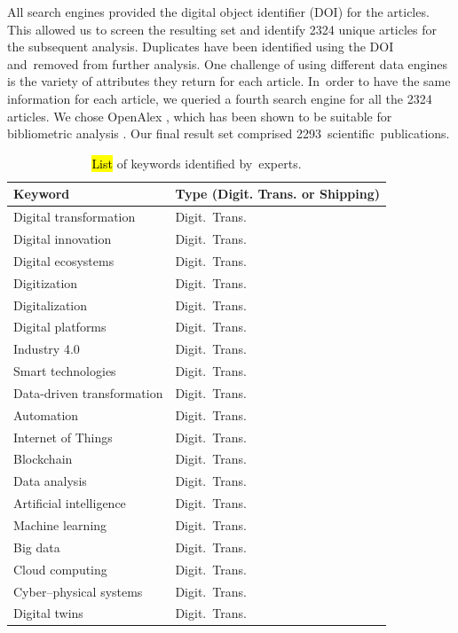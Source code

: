 \documentclass[jmse,review,accept,pdftex,moreauthors]{Definitions/mdpi}
\begin{document}
All search engines provided the digital object identifier (DOI) for the articles. This allowed us to screen the resulting set and identify 2324 unique articles for the subsequent analysis. Duplicates have been identified using the DOI and~removed from further analysis. One challenge of using different data engines is the variety of attributes they return for each article. In~order to have the same information for each article, we queried a fourth search engine for all the 2324 articles. We chose OpenAlex \citep{priem2022openalex}, which has been shown to be suitable for bibliometric analysis \citep{alperin2024analysis}. Our final result set comprised 2293~scientific~publications.


\begin{table}[H]
	\caption{\hl{List} %
 of keywords identified by~experts.}
	\begin{tabularx}{\linewidth}{XX}
		\toprule
		\textbf{Keyword}& \textbf{Type (Digit. Trans. or Shipping)} \\
		\midrule
		Digital transformation & Digit.~Trans. \\
		Digital innovation & Digit.~Trans. \\
		Digital ecosystems & Digit.~Trans. \\
		Digitization & Digit.~Trans. \\
		Digitalization & Digit.~Trans. \\
		Digital platforms & Digit.~Trans. \\
		Industry 4.0 & Digit.~Trans. \\
		Smart technologies & Digit.~Trans. \\
		Data-driven transformation & Digit.~Trans. \\
		Automation & Digit.~Trans. \\
		Internet of Things & Digit.~Trans. \\
		Blockchain & Digit.~Trans. \\
		Data analysis & Digit.~Trans. \\
		Artificial intelligence & Digit.~Trans. \\
		Machine learning & Digit.~Trans. \\
		Big data & Digit.~Trans. \\
		Cloud computing & Digit.~Trans. \\
		Cyber--physical systems & Digit.~Trans. \\
		Digital twins & Digit.~Trans. \\

\end{tabularx}
\end{table}
\end{document}
